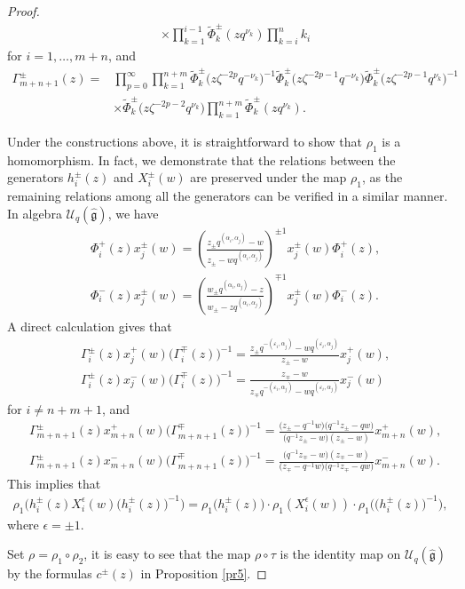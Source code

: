 \documentclass[10pt,a4paper]{amsart}
\numberwithin{equation}{section}
\begin{document}
\begin{proof}
\begin{align*}
 &\times\prod\limits_{k=1}^{i-1}\widetilde{\Phi}^{\pm}_{k}(z q^{\nu_k})\prod\limits_{k=i}^{n}k_i
\end{align*}
for $i=1,\dots,m+n$, and
\begin{align*}
 \Gamma_{m+n+1}^{\pm}(z)={}&\prod\limits_{p=0}^{\infty}\prod\limits_{k=1}^{n+m}\widetilde{\Phi}^{\pm}_{k}\bigl(z\zeta^{-2p} q^{-\nu_k}\bigr)^{-1}\widetilde{\Phi}^{\pm}_{k}\bigl(z\zeta^{-2p-1} q^{-\nu_k}\bigr)\widetilde{\Phi}^{\pm}_{k}\bigl(z\zeta^{-2p-1} q^{\nu_k}\bigr)^{-1}\\
 &\times\widetilde{\Phi}^{\pm}_{k}\bigl(z\zeta^{-2p-2} q^{\nu_k}\bigr)
 \prod\limits_{k=1}^{n+m}\widetilde{\Phi}^{\pm}_{k}(z q^{\nu_k}).
\end{align*}

Under the constructions above, it is straightforward to show that $\rho_1$ is a homomorphism. In fact,
we demonstrate that the relations between the generators $h_i^{\pm}(z)$ and $X_i^{\pm}(w)$ are preserved under the map $\rho_1$, as the remaining relations among all the generators can be verified in a similar manner.
In algebra $\mathcal{U}_q(\mathfrak{\hat{g}})$, we have
\begin{align*}
 &\Phi^{+}_i(z)x_j^{\pm}(w)=\left(\frac{z_{\pm}q^{(\alpha_i,\alpha_j)}-w}{z_{\pm}-wq^{(\alpha_i,\alpha_j)}}\right)^{\pm1}x_j^{\pm}(w)\Phi^{+}_i(z),\\
 & \Phi^{-}_i(z)x_j^{\pm}(w)=\left(\frac{w_{\pm}q^{(\alpha_i,\alpha_j)}-z}{w_{\pm}-zq^{(\alpha_i,\alpha_j)}}\right)^{\mp1}x_j^{\pm}(w)\Phi^{-}_i(z).
\end{align*}A direct calculation gives that
\begin{align*}
 &\Gamma_i^{\pm}(z)x_j^{+}(w)\bigl(\Gamma_i^{\mp}(z)\bigr)^{-1}=\frac{z_{\pm}q^{-(\varepsilon_i,\alpha_j)}-wq^{(\varepsilon_i,\alpha_j)}}{z_{\pm}-w}
 x_j^{+}(w),\\
 &\Gamma_i^{\pm}(z)x_j^{-}(w)\bigl(\Gamma_i^{\mp}(z)\bigr)^{-1}=\frac{z_{\mp}-w}{z_{\mp}q^{-(\varepsilon_i,\alpha_j)}-wq^{(\varepsilon_i,\alpha_j)}}
 x_j^{-}(w)
\end{align*}for $i\neq n+m+1$, and
\begin{align*}
 &\Gamma_{m+n+1}^{\pm}(z)x_{m+n}^+(w)\bigl(\Gamma_{m+n+1}^{\mp}(z)\bigr)^{-1}=\frac{\bigl(z_{\pm}-q^{-1}w\bigr)\bigl(q^{-1}z_{\pm}-qw\bigr)}{\bigl(q^{-1}z_{\pm}-w\bigr)(z_{\pm}-w)}x_{m+n}^+(w),\\
 &\Gamma_{m+n+1}^{\pm}(z)x_{m+n}^-(w)\bigl(\Gamma_{m+n+1}^{\mp}(z)\bigr)^{-1}=\frac{\bigl(q^{-1}z_{\mp}-w\bigr)(z_{\mp}-w)}{\bigl(z_{\mp}-q^{-1}w\bigr)\bigl(q^{-1}z_{\mp}-qw\bigr)}x_{m+n}^-(w).
\end{align*}This implies that
\begin{gather*}
 \rho_1\bigl(h_i^{\pm}(z)X_i^{\epsilon}(w)\bigl(h_i^{\pm}(z)\bigr)^{-1}\bigr)=\rho_1\bigl(h_i^{\pm}(z)\bigr)\cdot\rho_1(X_i^{\epsilon}(w))\cdot\rho_1\bigl(\bigl(h_i^{\pm}(z)\bigr)^{-1}\bigr),
\end{gather*}where $\epsilon=\pm1$.

Set $\rho=\rho_1\circ\rho_2$, it is easy to see that the map $\rho\circ\tau$ is the identity map on $\mathcal{U}_q(\mathfrak{\hat{g}})$ by the formulas $c^{\pm}(z)$ in Proposition \ref{pr5}.
\end{proof}
\end{document}
